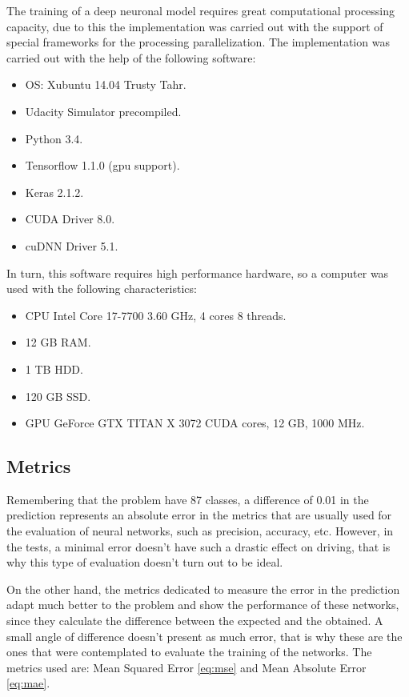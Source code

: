 \documentclass{cys}
\begin{document}
The training of a deep neuronal model requires great computational processing capacity, due to this the implementation was carried out with the support of special frameworks for the processing parallelization. The implementation was carried out with the help of the following software:

\begin{itemize}
	\item OS: Xubuntu 14.04 Trusty Tahr.
	\item Udacity Simulator precompiled.
	\item Python 3.4.
	\item Tensorflow 1.1.0 (gpu support).
	\item Keras 2.1.2.
	\item CUDA Driver 8.0.
	\item cuDNN Driver 5.1.
\end{itemize}

In turn, this software requires high performance hardware, so a computer was used with the following characteristics:

\begin{itemize}
	\item CPU Intel Core 17-7700 3.60 GHz, 4 cores 8 threads.
	\item 12 GB RAM.
	\item 1 TB HDD.
	\item 120 GB SSD.
	\item GPU GeForce GTX TITAN X 3072 CUDA cores, 12 GB, 1000 MHz.
\end{itemize}


\subsection{Metrics}

Remembering that the problem have 87 classes, a difference of 0.01 in the prediction represents an absolute error in the metrics that are usually used for the evaluation of neural networks, such as precision, accuracy, etc. However, in the tests, a minimal error doesn't have such a drastic effect on driving, that is why this type of evaluation doesn't turn out to be ideal.

On the other hand, the metrics dedicated to measure the error in the prediction adapt much better to the problem and show the performance of these networks, since they calculate the difference between the expected and the obtained. A small angle of difference doesn't present as much error, that is why these are the ones that were contemplated to evaluate the training of the networks. The metrics used are: Mean Squared Error \ref{eq:mse} and Mean Absolute Error \ref{eq:mae}.
\end{document}
